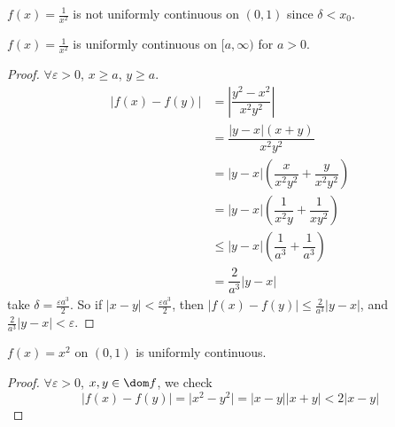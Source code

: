 \documentclass{report}
\begin{document}
\begin{examples}
    \begin{example}
        $f(x) = \frac{1}{x^{2}}$ is not uniformly continuous on $(0, 1)$ since $\delta < x_{0}$.
    \end{example}
    \begin{example}
        $f(x) = \frac{1}{x^{2}}$ is uniformly continuous on $[a, \infty)$ for $a > 0$.
            \begin{proof}
                $\forall \varepsilon > 0$, $x \geq a$, $y \geq a$.
                    \begin{align*}
                        \lvert f(x) - f(y) \rvert & =   \left\lvert \dfrac{y^{2} - x^{2}}{x^{2}y^{2}} \right\rvert                     \\
                                                  & =   \dfrac{\lvert y - x \rvert(x + y)}{x^{2}y^{2}}                                 \\
                                                  &=    \lvert y - x \rvert \left(\dfrac{x}{x^{2}y^{2}} + \dfrac{y}{x^{2}y^{2}}\right) \\
                                                  &=    \lvert y - x \rvert \left(\dfrac{1}{x^{2}y} + \dfrac{1}{xy^{2}}\right)         \\
                                                  &\leq  \lvert y - x \rvert \left(\dfrac{1}{a^{3}} + \dfrac{1}{a^{3}}\right)          \\
                                                  &=    \dfrac{2}{a^{3}}\lvert y - x \rvert                                              
                    \end{align*}
                take $\delta = \frac{\varepsilon a^{3}}{2}$. So if $\lvert x - y \rvert <\frac{ \varepsilon a^{3}}{2}$, then $\lvert f(x) - f(y) \rvert \leq\frac{2}{a^{3}}\lvert y - x \rvert$, and $\frac{2}{a^{3}}\lvert y - x \rvert  < \varepsilon$.
            \end{proof}
    \end{example}
    \begin{example}
        $f(x) = x^{2}$ on $(0, 1)$ is uniformly continuous.
            \begin{proof}
                $\forall \varepsilon> 0$, $x, y \in \dom f$, we check
                    \begin{equation*}
                        \lvert f(x) - f(y) \rvert = \lvert x^{2} - y^{2} \rvert = \lvert x - y \rvert \lvert x + y \rvert < 2\lvert x - y \rvert
                    \end{equation*}

\end{proof}
\end{example}
\end{examples}
\end{document}
